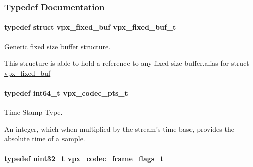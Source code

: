 \subsubsection{Typedef Documentation}
\hypertarget{group__encoder_ga21fab7dd28065f349c97165501223764}{
\paragraph[{vpx\+\_\+fixed\+\_\+buf\+\_\+t}]{\setlength{\rightskip}{0pt plus 5cm}typedef struct {\bf vpx\+\_\+fixed\+\_\+buf}  {\bf vpx\+\_\+fixed\+\_\+buf\+\_\+t}}}\label{group__encoder_ga21fab7dd28065f349c97165501223764}


Generic fixed size buffer structure. 

This structure is able to hold a reference to any fixed size buffer.\+alias for struct \hyperlink{structvpx__fixed__buf}{vpx\+\_\+fixed\+\_\+buf} \hypertarget{group__encoder_ga7e711b0a71c65aef8f0faea8bd57b05f}{
\paragraph[{vpx\+\_\+codec\+\_\+pts\+\_\+t}]{\setlength{\rightskip}{0pt plus 5cm}typedef int64\+\_\+t {\bf vpx\+\_\+codec\+\_\+pts\+\_\+t}}}\label{group__encoder_ga7e711b0a71c65aef8f0faea8bd57b05f}


Time Stamp Type. 

An integer, which when multiplied by the stream's time base, provides the absolute time of a sample. \hypertarget{group__encoder_gaac8ee319b9a6175f6946f59437c7ae4b}{
\paragraph[{vpx\+\_\+codec\+\_\+frame\+\_\+flags\+\_\+t}]{\setlength{\rightskip}{0pt plus 5cm}typedef uint32\+\_\+t {\bf vpx\+\_\+codec\+\_\+frame\+\_\+flags\+\_\+t}}}\label{group__encoder_gaac8ee319b9a6175f6946f59437c7ae4b}


